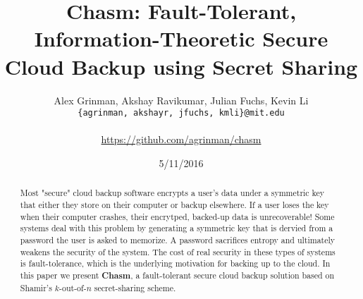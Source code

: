 \documentclass[letterpaper,twocolumn,10pt]{article}
\begin{document}
\color{Black}
\title{Chasm: Fault-Tolerant, Information-Theoretic Secure Cloud Backup using Secret Sharing}
\author{Alex Grinman, Akshay Ravikumar, Julian Fuchs, Kevin Li \\ \texttt{\{agrinman, akshayr, jfuchs, kmli\}@mit.edu} \\\\ \url{https://github.com/agrinman/chasm}}
\date{5/11/2016}
\maketitle

\begin{abstract}
Most "secure" cloud backup software encrypts a user's data under a symmetric key that either they store on their computer or backup elsewhere. If a user loses the key when their computer crashes, their encrytped, backed-up data is unrecoverable! Some systems deal with this problem by generating a symmetric key that is dervied from a password the user is asked to memorize. A password sacrifices entropy and ultimately weakens the security of the system. The cost of real security in these types of systems is fault-tolerance, which is the underlying motivation for backing up to the cloud. In this paper we present {\bf Chasm}, a fault-tolerant secure cloud backup solution based on Shamir's $k$-out-of-$n$ secret-sharing scheme.
\end{abstract}
\end{document}
